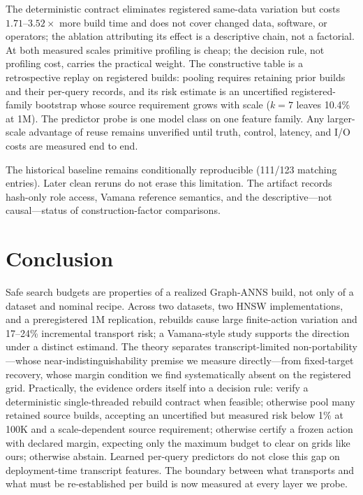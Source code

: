 \documentclass{article}
\begin{document}
The deterministic contract eliminates registered same-data variation but costs $1.71$--$3.52\times$ more
build time and does not cover changed data, software, or operators; the ablation attributing its effect is a
descriptive chain, not a factorial. At both measured scales primitive profiling is cheap; the decision rule,
not profiling cost, carries the practical weight. The constructive table is a retrospective replay on
registered builds: pooling requires retaining prior builds and their per-query records, and its risk
estimate is an uncertified registered-family bootstrap whose source requirement grows with scale ($k{=}7$
leaves 10.4\% at 1M). The predictor probe is one model class on one feature family. Any larger-scale
advantage of reuse remains unverified until truth, control, latency, and I/O costs are measured end to end.

The historical baseline remains conditionally reproducible (111/123 matching entries). Later clean reruns do
not erase this limitation. The artifact records hash-only role access, Vamana reference semantics, and the
descriptive---not causal---status of construction-factor comparisons.

\section{Conclusion}
\label{sec:conclusion}

Safe search budgets are properties of a realized Graph-ANNS build, not only of a dataset and nominal
recipe. Across two datasets, two HNSW implementations, and a preregistered 1M replication, rebuilds cause
large finite-action variation and 17--24\% incremental transport risk; a Vamana-style study supports the
direction under a distinct estimand. The theory separates transcript-limited non-portability---whose
near-indistinguishability premise we measure directly---from fixed-target recovery, whose margin condition
we find systematically absent on the registered grid. Practically, the evidence orders itself into a
decision rule: verify a deterministic single-threaded rebuild contract when feasible; otherwise pool many
retained source builds, accepting an uncertified but measured risk below 1\% at 100K and a scale-dependent
source requirement; otherwise certify a frozen action with declared margin, expecting only the maximum
budget to clear on grids like ours; otherwise abstain. Learned per-query predictors do not close this gap on
deployment-time transcript features. The boundary between what transports and what must be re-established
per build is now measured at every layer we probe.
\end{document}
